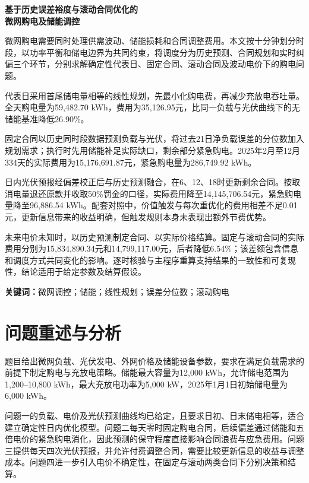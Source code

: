 \documentclass[12pt,a4paper]{ctexart}
\begin{document}
\begin{center}{\LARGE\bfseries 基于历史误差裕度与滚动合同优化的\\微网购电及储能调控}\par\vspace{1em}{\large\bfseries 摘要}\end{center}
微网购电需要同时处理供需波动、储能损耗和合同调整费用。本文按十分钟划分时段，以功率平衡和储电边界为共同约束，将调度分为历史预测、合同规划和实时纠偏三个环节，分别求解确定性代表日、固定合同、滚动合同及波动电价下的购电问题。

代表日采用首尾储电量相等的线性规划，先最小化购电费，再减少充放电吞吐量。全天购电量为59,482.70 kWh，费用为35,126.95元，比同一负载与光伏曲线下的无储能基准降低26.90\%。

固定合同以历史同时段数据预测负载与光伏，将过去21日净负载误差的分位数加入规划需求；执行时先用储能补足实际缺口，剩余部分紧急购电。2025年2月至12月334天的实际费用为15,176,691.87元，紧急购电量为286,749.92 kWh。

日内光伏预报经偏差校正后与历史预测融合，在6、12、18时更新剩余合同。按取消电量退还原款并收取50\%罚金的口径，实际费用降至14,145,706.54元，紧急购电量降至96,886.54 kWh。配套对照中，价值触发与每次重优化的费用相差不足0.01元，更新信息带来的收益明确，但触发规则本身未表现出额外节费优势。

未来电价未知时，以历史预测制定合同、以实际价格结算。固定与滚动合同的实际费用分别为15,834,890.34元和14,799,117.00元，后者降低6.54\%；该差额包含信息和调度方式共同变化的影响。逐时核验与主程序重算支持结果的一致性和可复现性，结论适用于给定参数及结算假设。

\vspace{0.8em}\noindent\textbf{关键词：}微网调控；储能；线性规划；误差分位数；滚动购电
\newpage
\section{问题重述与分析}
题目给出微网负载、光伏发电、外网价格及储能设备参数\cite{problem}，要求在满足负载需求的前提下制定购电与充放电策略。储能最大容量为12,000 kWh，允许储电范围为1,200--10,800 kWh，最大充放电功率为5,000 kW，2025年1月1日初始储电量为6,000 kWh。

问题一的负载、电价及光伏预测曲线均已给定，且要求日初、日末储电相等，适合建立确定性日内优化模型。问题二每天零时固定购电合同，后续偏差通过储能和五倍电价的紧急购电消化，因此预测的保守程度直接影响合同浪费与应急费用。问题三提供每天四次光伏预报，并允许付费调整合同，需要比较更新信息的收益与调整成本。问题四进一步引入电价不确定性，在固定与滚动两类合同下分别决策和结算。
\end{document}
